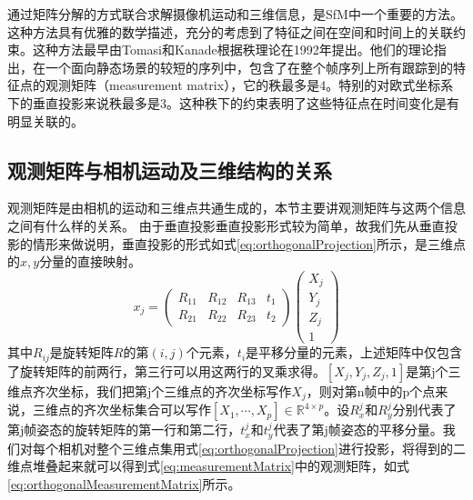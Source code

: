 通过矩阵分解的方式联合求解摄像机运动和三维信息，是SfM中一个重要的方法。这种方法具有优雅的数学描述，充分的考虑到了特征之间在空间和时间上的关联约束。这种方法最早由Tomasi和Kanade\cite{wx-ref}根据秩理论在1992年提出。他们的理论指出，在一个面向静态场景的较短的序列中，包含了在整个帧序列上所有跟踪到的特征点的观测矩阵（measurement matrix），它的秩最多是4。特别的对欧式坐标系下的垂直投影来说秩最多是3。这种秩下的约束表明了这些特征点在时间变化是有明显关联的。
\subsection{观测矩阵与相机运动及三维结构的关系}\label{subsec:measurementMatrix}
观测矩阵是由相机的运动和三维点共通生成的，本节主要讲观测矩阵与这两个信息之间有什么样的关系。
由于垂直投影垂直投影形式较为简单，故我们先从垂直投影的情形来做说明，垂直投影的形式如式\eqref{eq:orthogonalProjection}所示，是三维点的$x,y$分量的直接映射。
\begin{equation}\label{eq:affineCameraModel}
x_j=
\begin{pmatrix}
R_{11} & R_{12} & R_{13} & t_1\\
R_{21} & R_{22} & R_{23} & t_2
\end{pmatrix}
\begin{pmatrix}
X_j\\Y_j\\Z_j\\1
\end{pmatrix}
\end{equation}
其中$R_{ij}$是旋转矩阵$R$的第$(i,j)$个元素，$t_i$是平移分量的元素，上述矩阵中仅包含了旋转矩阵的前两行，第三行可以用这两行的叉乘求得。$[X_j,Y_j,Z_j,1]$是第j个三维点齐次坐标，我们把第j个三维点的齐次坐标写作$X_j$，则对第n帧中的p个点来说，三维点的齐次坐标集合可以写作$[X_1,\cdots,X_p]\in \mathbb{R}^{4\times p}$。设$R_x^j$和$R_y^j$分别代表了第j帧姿态的旋转矩阵的第一行和第二行，$t_x^j$和$t_y^j$代表了第j帧姿态的平移分量。我们对每个相机对整个三维点集用式\eqref{eq:orthogonalProjection}进行投影，将得到的二维点堆叠起来就可以得到式\eqref{eq:measurementMatrix}中的观测矩阵，如式\eqref{eq:orthogonalMeasurementMatrix}所示。

